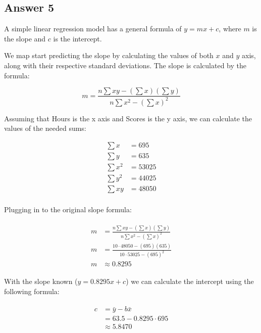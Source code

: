 \documentclass[
	11pt, %
]{assignment}
\begin{document}
\subsection*{Answer 5}

A simple linear regression model has a general formula of \(y = mx + c\), where \(m\) is the slope and \(c\) is the intercept.

We map start predicting the slope by calculating the values of both \(x\) and \(y\) axis, along with their respective standard deviations. The slope is calculated by the formula:

\begin{equation}
	m = \frac{ n \sum xy - (\sum x)(\sum y) }{ n \sum x^2 - (\sum x)^2 }
\end{equation}

Assuming that Hours is the x axis and Scores is the y axis, we can calculate the values of the needed sums:

\[
	\begin{aligned}
		\sum x &= 695     \\
		\sum y &= 635     \\
		\sum x^2 &= 53025 \\
		\sum y^2 &= 44025 \\
		\sum xy &= 48050  \\
	\end{aligned}
\]

\pagebreak

Plugging in to the original slope formula:

\begin{align}
	\begin{aligned}
		m &= \frac{ n \sum xy - (\sum x)(\sum y) }{ n \sum x^2 - (\sum x)^2 }\\
		m &= \frac{10 \cdot 48050 - (695)(635) }{ 10 \cdot 53025 - (695)^2 }\\
		m &\approx 0.8295
	\end{aligned}
\end{align}

With the slope known (\(y = 0.8295x + c\)) we can calculate the intercept using the following formula:

\begin{align}
	\begin{aligned}
		c &= \bar{y} - b\bar{x} \\
		  &= 63.5 - 0.8295 \cdot 695 \\
			&\approx 5.8470
	\end{aligned}
\end{align}
\end{document}
